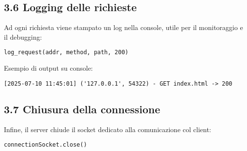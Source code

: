 \documentclass[a4paper,12pt]{report}
\begin{document}
\subsection*{3.6 Logging delle richieste}

Ad ogni richiesta viene stampato un log nella console, utile per il monitoraggio e il debugging:

\begin{verbatim}
log_request(addr, method, path, 200)
\end{verbatim}

Esempio di output su console:

\begin{verbatim}
[2025-07-10 11:45:01] ('127.0.0.1', 54322) - GET index.html -> 200
\end{verbatim}



\subsection*{3.7 Chiusura della connessione}

Infine, il server chiude il socket dedicato alla comunicazione col client:

\begin{verbatim}
connectionSocket.close()
\end{verbatim}
\end{document}
